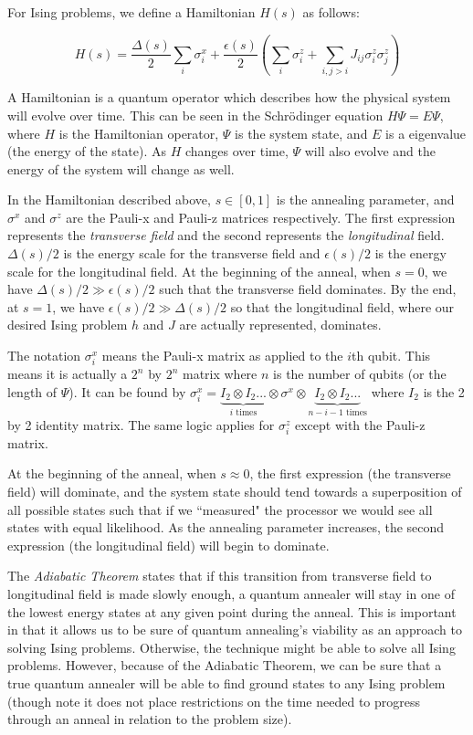 \documentclass[11pt]{report}
\newcommand{\?}{\stackrel{?}{=}}
\begin{document}
For Ising problems, we define a Hamiltonian $H(s)$ as follows:

$$H(s) = \frac{\Delta(s)}{2}\sum_i \sigma^x_i + \frac{\epsilon(s)}{2}\left(\sum_i \sigma^z_i + \sum_{i, j>i}J_{ij}\sigma^z_i \sigma^z_j\right)$$

A Hamiltonian is a quantum operator which describes how the physical system will evolve over time. This can be seen in the Schr\"{o}dinger equation $H\Psi = E\Psi$, where $H$ is the Hamiltonian operator, $\Psi$ is the system state, and $E$ is a eigenvalue (the energy of the state). As $H$ changes over time, $\Psi$ will also evolve and the energy of the system will change as well.

In the Hamiltonian described above, $s \in [0,1]$ is the annealing parameter, and $\sigma^x$ and $\sigma^z$ are the Pauli-x and Pauli-z matrices respectively. The first expression represents the \textit{transverse field} and the second represents the \textit{longitudinal} field. $\Delta(s)/2$ is the energy scale for the transverse field and $\epsilon(s)/2$ is the energy scale for the longitudinal field. At the beginning of the anneal, when $s = 0$, we have $\Delta(s)/2 \gg \epsilon(s)/2$ such that the transverse field dominates. By the end, at $s=1$, we have $\epsilon(s)/2 \gg \Delta(s)/2$ so that the longitudinal field, where our desired Ising problem $h$ and $J$ are actually represented, dominates.

The notation $\sigma^x_i$ means the Pauli-x matrix as applied to the $i$th qubit. This means it is actually a $2^n$ by $2^n$ matrix where $n$ is the number of qubits (or the length of $\Psi$). It can be found by $\sigma^x_i = \underbrace{I_2 \otimes I_2...}_{i \text{ times}} \otimes \sigma^x \otimes \underbrace{I_2 \otimes I_2...}_{n - i - 1 \text{ times}}$ where $I_2$ is the 2 by 2 identity matrix. The same logic applies for $\sigma^z_i$ except with the Pauli-z matrix.

At the beginning of the anneal, when $s \approx 0$, the first expression (the transverse field) will dominate, and the system state should tend towards a superposition of all possible states such that if we ``measured" the processor we would see all states with equal likelihood. As the annealing parameter increases, the second expression (the longitudinal field) will begin to dominate. 

The \textit{Adiabatic Theorem} states that if this transition from transverse field to longitudinal field is made slowly enough, a quantum annealer will stay in one of the lowest energy states at any given point during the anneal. This is important in that it allows us to be sure of quantum annealing's viability as an approach to solving Ising problems. Otherwise, the technique might be able to solve all Ising problems. However, because of the Adiabatic Theorem, we can be sure that a true quantum annealer will be able to find ground states to any Ising problem (though note it does not place restrictions on the time needed to progress through an anneal in relation to the problem size).
\end{document}
